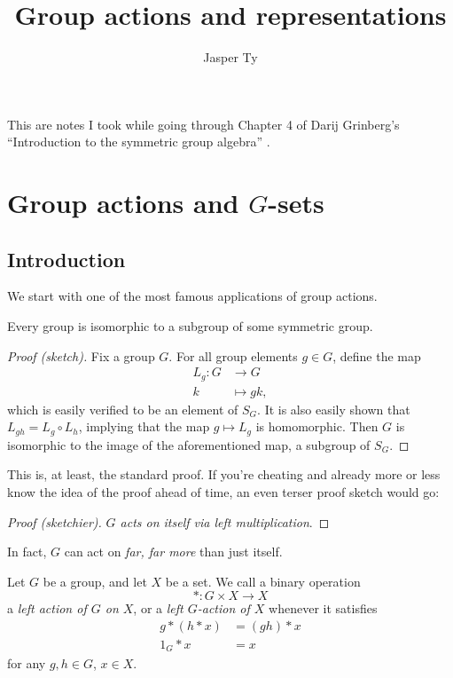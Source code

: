 \documentclass{article}
\title{Group actions and representations}
\author{Jasper Ty}
\date{}
\begin{document}
\maketitle

This are notes I took while going through Chapter 4 of Darij Grinberg's ``Introduction to the symmetric group algebra'' \cite{DarijSGA}.

\tableofcontents

\section{Group actions and \texorpdfstring{$G$}{G}-sets}

\subsection{Introduction}

We start with one of the most famous applications of group actions.

\begin{theorem}\label{thm:cayley}
    Every group is isomorphic to a subgroup of some symmetric group.
\end{theorem}
\begin{proof}[Proof (sketch)]
    Fix a group $G$. For all group elements $g \in G$, define the map
    \begin{align*}
        L_g: G &\to G \\
        k &\mapsto gk,
    \end{align*}
    which is easily verified to be an element of $S_G$.
    It is also easily shown that $L_{gh} = L_g \circ L_h$, implying that the map $g \mapsto L_g$ is homomorphic. 
    Then $G$ is isomorphic to the image of the aforementioned map, a subgroup of $S_G$.
\end{proof}

This is, at least, the standard proof.
If you're cheating and already more or less know the idea of the proof ahead of time, an even terser proof sketch would go:

\begin{proof}[Proof (sketchier)]
    \textit{$G$ acts on itself via left multiplication}.
\end{proof}

In fact, $G$ can act on \textit{far, far more} than just itself.

\begin{definition}
    Let $G$ be a group, and let $X$ be a set.
    We call a binary operation
    \[
        \ast : G \times X \to X
    \]
    a \textit{left action of $G$ on $X$}, or a \textit{left $G$-action of $X$} whenever it satisfies
    \begin{align*}
        g \ast (h \ast x) &= (gh) \ast x \\
        1_G \ast x &= x
    \end{align*}
for any $g,h \in G$, $x \in X$.
\end{definition}
\end{document}
